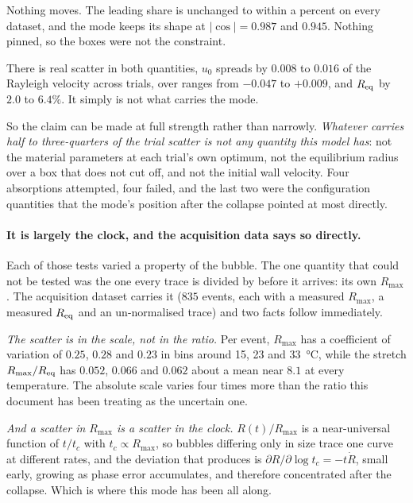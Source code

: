 \documentclass[10pt]{article}
\begin{document}
\noindent Nothing moves. The leading share is unchanged to within a percent on every dataset, and
the mode keeps its shape at $\lvert\cos\rvert = 0.987$ and $0.945$. Nothing pinned, so the boxes
were not the constraint.

There is real scatter in both quantities, $u_0$ spreads by $0.008$ to $0.016$ of the Rayleigh
velocity across trials, over ranges from $-0.047$ to $+0.009$, and $R_{\rm eq}$ by $2.0$ to
$6.4\%$. It simply is not what carries the mode.

So the claim can be made at full strength rather than narrowly. \emph{Whatever carries half to
three-quarters of the trial scatter is not any quantity this model has}: not the material
parameters at each trial's own optimum, not the equilibrium radius over a box that does not cut
off, and not the initial wall velocity. Four absorptions attempted, four failed, and the last two
were the configuration quantities that the mode's position after the collapse pointed at most
directly.

\paragraph{It is largely the clock, and the acquisition data says so directly.}
Each of those tests varied a property of the bubble. The one quantity that could not be tested
was the one every trace is divided by before it arrives: its own $R_{\max}$. The acquisition
dataset carries it ($835$ events, each with a measured $R_{\max}$, a measured $R_{\rm eq}$ and
an un-normalised trace) and two facts follow immediately.

\emph{The scatter is in the scale, not in the ratio.} Per event, $R_{\max}$ has a coefficient of
variation of $0.25$, $0.28$ and $0.23$ in bins around \SI{15}{}, \SI{23}{} and
\SI{33}{\celsius}, while the stretch $R_{\max}/R_{\rm eq}$ has $0.052$, $0.066$ and $0.062$ about
a mean near $8.1$ at every temperature. The absolute scale varies four times more than the ratio
this document has been treating as the uncertain one.

\emph{And a scatter in $R_{\max}$ is a scatter in the clock.} $R(t)/R_{\max}$ is a near-universal
function of $t/t_c$ with $t_c\propto R_{\max}$, so bubbles differing only in size trace one curve
at different rates, and the deviation that produces is
$\partial R/\partial\log t_c = -t\dot R$, small early, growing as phase error accumulates,
and therefore concentrated after the collapse. Which is where this mode has been all along.
\end{document}
